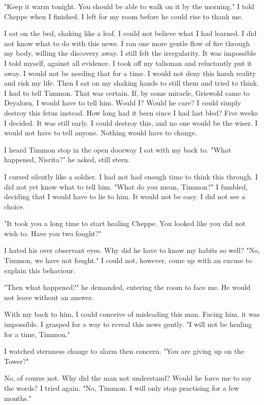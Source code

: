 \documentclass{article}
\begin{document}
"Keep it warm tonight. You should be able to walk on it by the morning." I told Cheppe when I finished. I left for my room before he could rise to thank me. 

I sat on the bed, shaking like a leaf. I could not believe what I had learned. I did not know what to do with this news. I ran one more gentle flow of fire  through my body, willing the discovery away. I still felt the irregularity. It was impossible I told myself, against all evidence. I took off my talisman and reluctantly put it away. I would not be needing that for a time. I would not deny this harsh reality and risk my life. Then I sat on my shaking hands to still them and tried to think. I had to tell Timmon. That was certain. If, by some miracle, Griswold came to Deyalorn, I would have to tell him. Would I? Would he care? I could simply destroy this fetus instead. How long had it been since I had last bled? Five weeks I decided. It was still early. I could destroy this, and no one would be the wiser. I would not have to tell anyone. Nothing would have to change.

I heard Timmon stop in the open doorway I sat with my back to. "What happened, Nisrita?" he asked, still stern.

I cursed silently like a soldier. I had not had enough time to think this through. I did not yet know what to tell him. "What do you mean, Timmon?" I fumbled, deciding that I would have to lie to him. It would not be easy. I did not see a choice. 

"It took you a long time to start healing Cheppe. You looked like you did not wish to. Have you two fought?"

I hated his over observant eyes. Why did he have to know my habits so well? "No, Timmon, we have not fought." I could not, however, come up with an excuse to explain this behaviour.

"Then what happened?" he demanded, entering the room to face me. He would not leave without an answer. 

With my back to him, I could conceive of misleading this man. Facing him, it was impossible. I grasped for a way to reveal this news gently. "I will not be healing for a time, Timmon."

I watched sternness change to alarm then concern. "You are giving up on the Tower?"

No, of course not. Why did the man not understand? Would he force me to say the words? I tried again. "No, Timmon. I will only stop practising for a few months."
\end{document}
